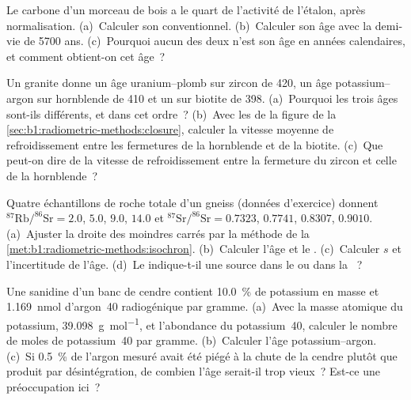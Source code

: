 \begin{exercise}[$\star$]\label{exo:b1:radiometric-methods:3}
Le carbone d'un morceau de bois a le quart de l'activité de l'étalon,
après normalisation. (a)~Calculer son  conventionnel. (b)~Calculer
son âge avec la demi-vie de \num{5700} ans. (c)~Pourquoi aucun des deux n'est son
âge en années calendaires, et comment obtient-on cet âge~?
\end{exercise}

\begin{exercise}[$\star$]\label{exo:b1:radiometric-methods:4}
Un granite donne un âge uranium--plomb sur zircon de \qty{420}{\Ma}, un âge
potassium--argon sur hornblende de \qty{410}{\Ma} et un sur biotite de
\qty{398}{\Ma}. (a)~Pourquoi les trois âges sont-ils différents, et dans cet ordre~?
(b)~Avec les  de la figure de la
\cref{sec:b1:radiometric-methods:closure}, calculer la vitesse moyenne de refroidissement entre
les fermetures de la hornblende et de la biotite. (c)~Que peut-on dire de la vitesse de refroidissement
entre la fermeture du zircon et celle de la hornblende~?
\end{exercise}

\begin{exercise}[$\star\star$]\label{exo:b1:radiometric-methods:5}
Quatre échantillons de roche totale d'un gneiss (données d'exercice) donnent
$^{87}\mathrm{Rb}/^{86}\mathrm{Sr} = 2.0$, $5.0$, $9.0$, $14.0$ et
$^{87}\mathrm{Sr}/^{86}\mathrm{Sr} = 0.7323$, $0.7741$, $0.8307$, $0.9010$.
(a)~Ajuster la droite des moindres carrés par la méthode de la
\cref{met:b1:radiometric-methods:isochron}. (b)~Calculer l'âge et le . (c)~Calculer $s$ et l'incertitude de l'âge. (d)~Le 
indique-t-il une source dans le  ou dans la ~?
\end{exercise}

\begin{exercise}[$\star\star$]\label{exo:b1:radiometric-methods:6}
Une sanidine d'un banc de cendre contient \qty{10.0}{\percent} de potassium en masse et
\qty{1.169}{nmol} d'argon~40 radiogénique par gramme. (a)~Avec la masse atomique du
potassium, \qty{39.098}{g.mol^{-1}}, et l'abondance du potassium~40, calculer
le nombre de moles de potassium~40 par gramme. (b)~Calculer l'âge potassium--argon.
(c)~Si \qty{0.5}{\percent} de l'argon mesuré avait été piégé à la chute de la
cendre plutôt que produit par désintégration, de combien l'âge serait-il trop vieux~? Est-ce
une préoccupation ici~?
\end{exercise}

